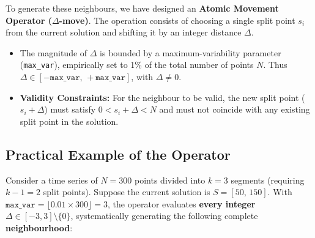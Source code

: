 \documentclass[12pt, a4paper]{article}
\begin{document}
To generate these neighbours, we have designed an \textbf{Atomic Movement Operator
  ($\Delta$\nobreakdash-move)}. The operation consists of choosing a single split point
$s_i$ from the current solution and shifting it by an integer distance $\Delta$.

\begin{itemize}[itemsep=0.3em]
  \item The magnitude of $\Delta$ is bounded by a maximum-variability parameter
        (\texttt{max\_var}), empirically set to 1\% of the total number of points $N$.
        Thus $\Delta \in [-\texttt{max\_var},\, +\texttt{max\_var}]$, with $\Delta \neq 0$.

  \item \textbf{Validity Constraints:} For the neighbour to be valid, the new split
        point ($s_i + \Delta$) must satisfy $0 < s_i + \Delta < N$ and must not coincide
        with any existing split point in the solution.
\end{itemize}

\subsection{Practical Example of the Operator}
Consider a time series of $N = 300$ points divided into $k = 3$ segments (requiring
$k-1 = 2$ split points). Suppose the current solution is $S = [50,\, 150]$. With
$\texttt{max\_var} = \lfloor 0.01 \times 300 \rfloor = 3$, the operator evaluates
\textbf{every integer $\Delta \in [-3, 3] \setminus \{0\}$}, systematically generating
the following complete \textbf{neighbourhood}:
\end{document}
